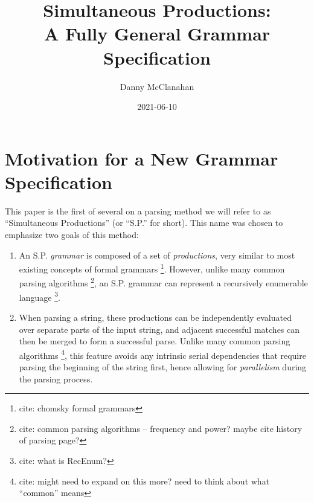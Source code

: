 \documentclass[10pt]{article}
\title{Simultaneous Productions: \\ A Fully General Grammar Specification}
\date{2021-06-10}
\author{Danny McClanahan}
\newcommand{\todocite}[1]{\footnote{cite: #1}}
\begin{document}
\maketitle

\section{Motivation for a New Grammar Specification}
\label{sec:motivation}

This paper is the first of several on a parsing method we will refer to as ``Simultaneous Productions'' (or ``S.P.'' for short). This name was chosen to emphasize two goals of this method:
\begin{enumerate}
  \item An S.P. \textit{grammar} is composed of a set of \textit{productions}, very similar to most existing concepts of formal grammars \todocite{chomsky formal grammars}. However, unlike many common parsing algorithms \todocite{common parsing algorithms -- frequency and power? maybe cite history of parsing page?}, an S.P. grammar can represent a recursively enumerable language \todocite{what is RecEnum?}.
  \item When parsing a string, these productions can be independently evaluated over separate parts of the input string, and adjacent successful matches can then be merged to form a successful parse. Unlike many common parsing algorithms \todocite{might need to expand on this more? need to think about what ``common'' means}, this feature avoids any intrinsic serial dependencies that require parsing the beginning of the string first, hence allowing for \textit{parallelism} during the parsing process.
\end{enumerate}
\end{document}
